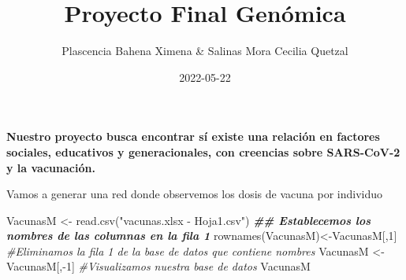 \documentclass[
]{article}
\title{Proyecto Final Genómica}
\author{Plascencia Bahena Ximena \& Salinas Mora Cecilia Quetzal}
\date{2022-05-22}
\newenvironment{Shaded}{\begin{snugshade}}{\end{snugshade}}
\newcommand{\CommentTok}[1]{\textcolor[rgb]{0.56,0.35,0.01}{\textit{#1}}}
\newcommand{\DecValTok}[1]{\textcolor[rgb]{0.00,0.00,0.81}{#1}}
\newcommand{\DocumentationTok}[1]{\textcolor[rgb]{0.56,0.35,0.01}{\textbf{\textit{#1}}}}
\newcommand{\FunctionTok}[1]{\textcolor[rgb]{0.00,0.00,0.00}{#1}}
\newcommand{\NormalTok}[1]{#1}
\newcommand{\OtherTok}[1]{\textcolor[rgb]{0.56,0.35,0.01}{#1}}
\newcommand{\SpecialCharTok}[1]{\textcolor[rgb]{0.00,0.00,0.00}{#1}}
\newcommand{\StringTok}[1]{\textcolor[rgb]{0.31,0.60,0.02}{#1}}
\begin{document}
\maketitle

\textbf{Nuestro proyecto busca encontrar sí existe una relación en
factores sociales, educativos y generacionales, con creencias sobre
SARS-CoV-2 y la vacunación.}

Vamos a generar una red donde observemos los dosis de vacuna por
individuo

\begin{Shaded}
\begin{Highlighting}[]
\NormalTok{VacunasM }\OtherTok{\textless{}{-}} \FunctionTok{read.csv}\NormalTok{(}\StringTok{"vacunas.xlsx {-} Hoja1.csv"}\NormalTok{)}
\DocumentationTok{\#\# Establecemos los nombres de las columnas en la fila 1}
\FunctionTok{rownames}\NormalTok{(VacunasM)}\OtherTok{\textless{}{-}}\NormalTok{VacunasM[,}\DecValTok{1}\NormalTok{]}
\CommentTok{\#Eliminamos la fila 1 de la base de datos que contiene nombres}
\NormalTok{VacunasM }\OtherTok{\textless{}{-}}\NormalTok{ VacunasM[,}\SpecialCharTok{{-}}\DecValTok{1}\NormalTok{]}
\CommentTok{\#Visualizamos nuestra base de datos}
\NormalTok{VacunasM}
\end{Highlighting}
\end{Shaded}
\end{document}
